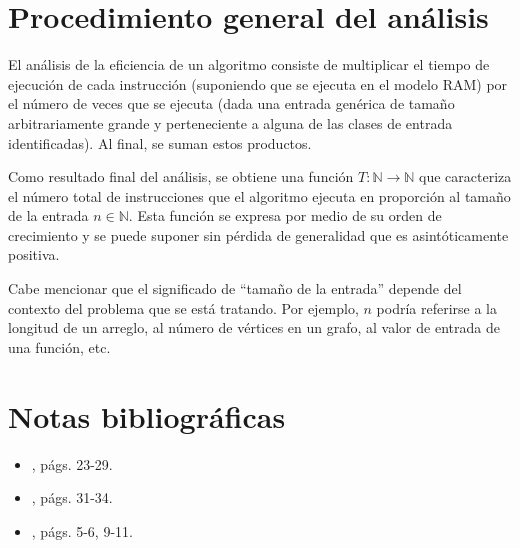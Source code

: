 \section{Procedimiento general del análisis}

El análisis de la eficiencia de un algoritmo consiste de multiplicar
el tiempo de ejecución de cada instrucción (suponiendo que se ejecuta
en el modelo RAM) por el número de veces que se ejecuta (dada una
entrada genérica de tamaño arbitrariamente grande y perteneciente
a alguna de las clases de entrada identificadas). Al final, se suman
estos productos. 

Como resultado final del análisis, se obtiene una función $T:\mathbb{N}\to\mathbb{N}$
que caracteriza el número total de instrucciones que el algoritmo ejecuta
en proporción al tamaño de la entrada $n\in\mathbb{N}$. Esta función
se expresa por medio de su orden de crecimiento y se puede suponer
sin pérdida de generalidad que es asintóticamente positiva. 

Cabe mencionar que el significado de ``tamaño de la entrada'' depende
del contexto del problema que se está tratando. Por ejemplo, $n$
podría referirse a la longitud de un arreglo, al número de vértices
en un grafo, al valor de entrada de una función, etc.

\section*{Notas bibliográficas}

\begin{itemize}
    \item \textcite{cormen_introduction_2009}, págs. 23-29.
    \item \textcite{skiena_algorithm_2011}, págs. 31-34.
    \item \textcite{goodrich_algorithm_2001}, págs. 5-6, 9-11.
\end{itemize}
